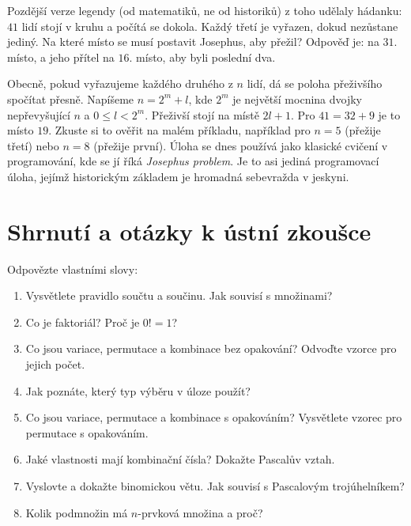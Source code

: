 Pozdější verze legendy (od matematiků, ne od historiků) z toho udělaly hádanku: $41$ lidí stojí v kruhu a počítá se dokola. Každý třetí je vyřazen, dokud nezůstane jediný. Na které místo se musí postavit Josephus, aby přežil? Odpověď je: na $31.$ místo, a jeho přítel na $16.$ místo, aby byli poslední dva.
\begin{center}
\end{center}

Obecně, pokud vyřazujeme každého druhého z $n$ lidí, dá se poloha přeživšího spočítat přesně. Napíšeme $n = 2^m + l$, kde $2^m$ je největší mocnina dvojky nepřevyšující $n$ a $0\leq l < 2^m$. Přeživší stojí na místě $2l + 1$. Pro $41 = 32 + 9$ je to místo $19$. Zkuste si to ověřit na malém příkladu, například pro $n = 5$ (přežije třetí) nebo $n = 8$ (přežije první). Úloha se dnes používá jako klasické cvičení v programování, kde se jí říká \textit{Josephus problem}. Je to asi jediná programovací úloha, jejímž historickým základem je hromadná sebevražda v jeskyni.

\section{Shrnutí a otázky k ústní zkoušce}

\begin{problem}
  Odpovězte vlastními slovy:
  \begin{enumerate}
    \item Vysvětlete pravidlo součtu a součinu. Jak souvisí s množinami?
    \item Co je faktoriál? Proč je $0! = 1$?
    \item Co jsou variace, permutace a kombinace bez opakování? Odvoďte vzorce pro jejich počet.
    \item Jak poznáte, který typ výběru v úloze použít?
    \item Co jsou variace, permutace a kombinace s opakováním? Vysvětlete vzorec pro permutace s opakováním.
    \item Jaké vlastnosti mají kombinační čísla? Dokažte Pascalův vztah.
    \item Vyslovte a dokažte binomickou větu. Jak souvisí s Pascalovým trojúhelníkem?
    \item Kolik podmnožin má $n$-prvková množina a proč?
  \end{enumerate}
\end{problem}
